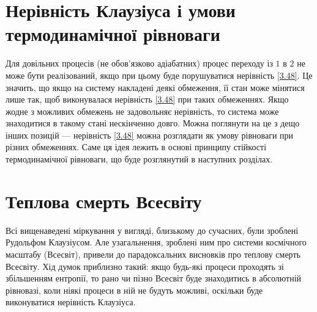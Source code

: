 \section{Нерівність Клаузіуса і умови термодинамічної рівноваги}


Для довільних процесів (не обов'язково адіабатних) процес переходу із $1$ в $2$ не може бути
реалізований,
якщо при цьому буде порушуватися нерівність \eqref{3.48}. Це значить, що якщо на систему накладені
деякі обмеження, її стан може мінятися лише так, щоб виконувалася нерівність \eqref{3.48} при таких
обмеженнях. Якщо жодне з можливих обмежень не задовольняє нерівність, то система може знаходитися в
такому стані нескінченно довго. Можна поглянути на це з дещо інших позицій --- нерівність \eqref{3.48}
можна розглядати як умову рівноваги при різних обмеженнях. Саме ця ідея лежить в основі принципу
стійкості термодинамічної рівноваги, що буде розглянутий в наступних розділах.



\section{Теплова смерть Всесвіту}

Всі вищенаведені міркування у вигляді, близькому до сучасних, були зроблені Рудольфом Клаузіусом. Але
узагальнення, зроблені ним про системи космічного масштабу (Всесвіт), привели до парадоксальних
висновків про теплову смерть Всесвіту. Хід думок приблизно такий: якщо будь-які процеси проходять зі
збільшенням ентропії, то рано чи пізно Всесвіт буде знаходитись в абсолютній рівновазі, коли ніякі
процеси в ній не будуть можливі, оскільки буде виконуватися нерівність Клаузіуса.

